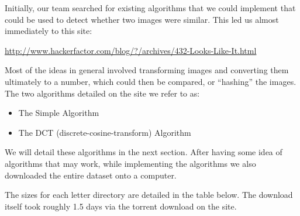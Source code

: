 \documentclass[11pt,a4paper,titlepage]{article}
\begin{document}
Initially, our team searched for existing algorithms that we could implement
that could be used to detect whether two images were similar.  This led us
almost immediately to this site:

\url{http://www.hackerfactor.com/blog/?/archives/432-Looks-Like-It.html}

Most of the ideas in general involved transforming images and converting them
ultimately to a number, which could then be compared, or ``hashing'' the
images.  The two algorithms detailed on the site we refer to as:

\begin{itemize}
    \item
        The Simple Algorithm
    \item
        The DCT (discrete-cosine-transform) Algorithm
\end{itemize}

We will detail these algorithms in the next section.  After having some idea of
algorithms that may work, while implementing the algorithms we also downloaded
the entire dataset onto a computer.

The sizes for each letter directory  are detailed in the table below.  The 
download itself took roughly 1.5 days via the torrent download on the site.
\end{document}
